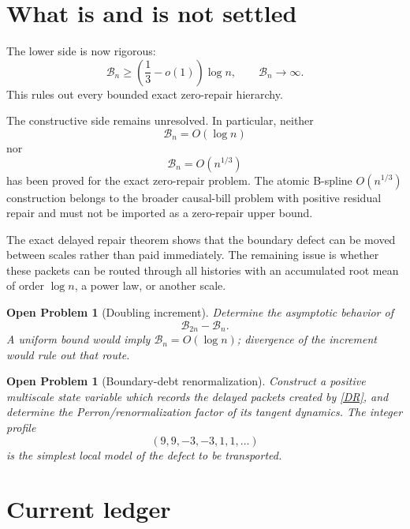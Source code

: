 \documentclass[11pt,a4paper]{article}
\newtheorem{problem}[theorem]{Open Problem}
\newcommand{\cB}{\mathcal B}
\newcommand{\1}{\mathbf 1}
\begin{document}
\section{What is and is not settled}

The lower side is now rigorous:
\[
\boxed{
\cB_n
\ge
\left(\frac13-o(1)\right)\log n,
\qquad
\cB_n\to\infty.
}
\]
This rules out every bounded exact zero-repair hierarchy.

The constructive side remains unresolved.  In particular, neither
\[
\cB_n=O(\log n)
\]
nor
\[
\cB_n=O(n^{1/3})
\]
has been proved for the exact zero-repair problem.  The atomic B-spline
\(O(n^{1/3})\) construction belongs to the broader causal-bill problem with
positive residual repair and must not be imported as a zero-repair upper bound.

The exact delayed repair theorem shows that the boundary defect can be moved
between scales rather than paid immediately.  The remaining issue is whether
these packets can be routed through all histories with an accumulated root mean
of order \(\log n\), a power law, or another scale.

\begin{problem}[Doubling increment]
Determine the asymptotic behavior of
\[
\boxed{
\cB_{2n}-\cB_n.
}
\]
A uniform bound would imply \(\cB_n=O(\log n)\); divergence of the increment
would rule out that route.
\end{problem}

\begin{problem}[Boundary-debt renormalization]
Construct a positive multiscale state variable which records the delayed
packets created by \eqref{DR}, and determine the Perron/renormalization factor
of its tangent dynamics.  The integer profile
\[
(9,9,-3,-3,1,1,\ldots)
\]
is the simplest local model of the defect to be transported.
\end{problem}

\section{Current ledger}
\end{document}
